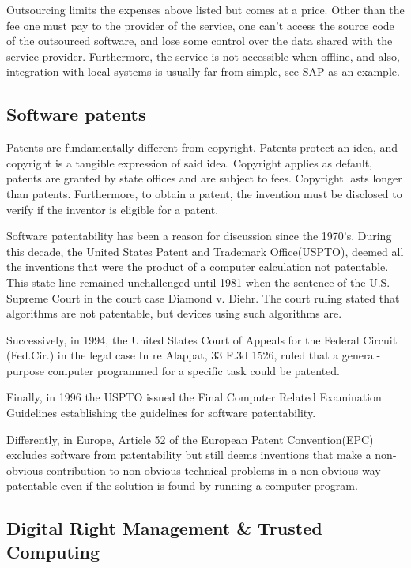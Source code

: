 Outsourcing limits the expenses above listed but comes at a price. Other than the fee one must pay to the provider of the service, one can't access the source code of the outsourced software, and lose some control over the data shared with the service provider. Furthermore, the service is not accessible when offline, and also, integration with local systems is usually far from simple, see SAP as an example.

\subsection*{Software patents}

Patents are fundamentally different from copyright. Patents protect an idea, and copyright is a tangible expression of said idea. Copyright applies as default, patents are granted by state offices and are subject to fees. Copyright lasts longer than patents. Furthermore, to obtain a patent, the invention must be disclosed to verify if the inventor is eligible for a patent.

Software patentability has been a reason for discussion since the 1970's. During this decade, the United States Patent and Trademark Office(USPTO), deemed all the inventions that were the product of a computer calculation not patentable. This state line remained unchallenged until 1981 when the sentence of the U.S. Supreme Court in the court case Diamond v. Diehr. The court ruling stated that algorithms are not patentable, but devices using such algorithms are.

Successively, in 1994, the United States Court of Appeals for the Federal Circuit (Fed.Cir.) in the legal case In re Alappat, 33 F.3d 1526, ruled that a general-purpose computer programmed for a specific task could be patented.

Finally, in 1996 the USPTO issued the Final Computer Related Examination Guidelines establishing the guidelines for software patentability.

Differently, in Europe, Article 52 of the European Patent Convention(EPC) excludes software from patentability but still deems inventions that make a non-obvious contribution to non-obvious technical problems in a non-obvious way patentable even if the solution is found by running a computer program.

\subsection*{Digital Right Management \& Trusted Computing}

